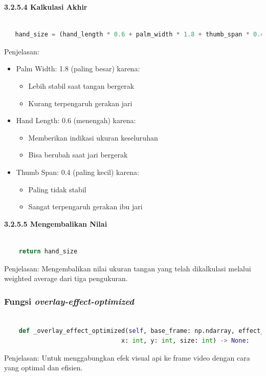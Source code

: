 \documentclass[11pt,a4paper]{article}
\begin{document}
    \noindent\textbf{3.2.5.4 Kalkulasi Akhir}
    \begin{lstlisting}[language=Python, caption=Kalkulasi Akhir]
        
   hand_size = (hand_length * 0.6 + palm_width * 1.8 + thumb_span * 0.4)
    \end{lstlisting}
    Penjelasan:
    \begin{itemize}
        \item Palm Width: 1.8 (paling besar) karena:
        \begin{itemize}
            \item Lebih stabil saat tangan bergerak
            \item Kurang terpengaruh gerakan jari
        \end{itemize}
        \item Hand Length: 0.6 (menengah) karena:
        \begin{itemize}
            \item Memberikan indikasi ukuran keseluruhan
            \item Bisa berubah saat jari bergerak
        \end{itemize}
        \item Thumb Span: 0.4 (paling kecil) karena:
        \begin{itemize}
            \item Paling tidak stabil
            \item Sangat terpengaruh gerakan ibu jari
        \end{itemize}
    \end{itemize}

    \noindent\textbf{3.2.5.5 Mengembalikan Nilai}
    \begin{lstlisting}[language=Python, caption=Mengembalikan Nilai]
        
    return hand_size
    \end{lstlisting}
    Penjelasan: Mengembalikan nilai ukuran tangan yang telah dikalkulasi melalui weighted average dari tiga pengukuran.

    \subsubsection{Fungsi \textit{overlay-effect-optimized}}
    \begin{lstlisting}[language=Python, caption=Fungsi \textit{overlay-effect-optimized}]
    
    def _overlay_effect_optimized(self, base_frame: np.ndarray, effect_frame: np.ndarray, 
                                x: int, y: int, size: int) -> None:
    \end{lstlisting}
    Penjelasan:
    Untuk menggabungkan efek visual api ke frame video dengan cara yang optimal dan efisien.
\end{document}
